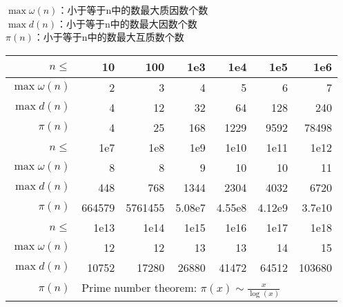\begin{center}
    $\max\omega(n)$：小于等于n中的数最大质因数个数\\
    $\max d(n)$：小于等于n中的数最大因数个数\\
    $\pi(n)$：小于等于n中的数最大互质数个数\\
    \begin{tabular}{|r|r|r|r|r|r|r|}
        \hline
        \rowcolor{gray!20}
        $n\leq$         & 10        & 100       & 1e3       & 1e4       & 1e5       & 1e6           \\ \hline
        $\max\omega(n)$ & 2         & 3         & 4         & 5         & 6         & 7             \\ \hline
        $\max d(n)$     & 4         & 12        & 32        & 64        & 128       & 240           \\ \hline
        $\pi(n)$        & 4         & 25        & 168       & 1229      & 9592      & 78498         \\ \hline
        \rowcolor{gray!20}
        $n\leq$         & 1e7       & 1e8       & 1e9       & 1e10      & 1e11      & 1e12          \\ \hline
        $\max\omega(n)$ & 8         & 8         & 9         & 10        & 10        & 11            \\ \hline
        $\max d(n)$     & 448       & 768       & 1344      & 2304      & 4032      & 6720          \\ \hline
        $\pi(n)$        & 664579    & 5761455   & 5.08e7    & 4.55e8    & 4.12e9    & 3.7e10        \\ \hline
        \rowcolor{gray!20}
        $n\leq$         & 1e13      & 1e14      & 1e15      & 1e16      & 1e17      & 1e18          \\ \hline
        $\max\omega(n)$ & 12        & 12        & 13        & 13        & 14        & 15            \\ \hline
        $\max d(n)$     & 10752     & 17280     & 26880     & 41472     & 64512     & 103680        \\ \hline
        $\pi(n)$        & \multicolumn{5}{l}{Prime number theorem: $\pi(x) \sim \frac{x}{\log(x)}$}&\\ \hline
    \end{tabular}
\end{center}